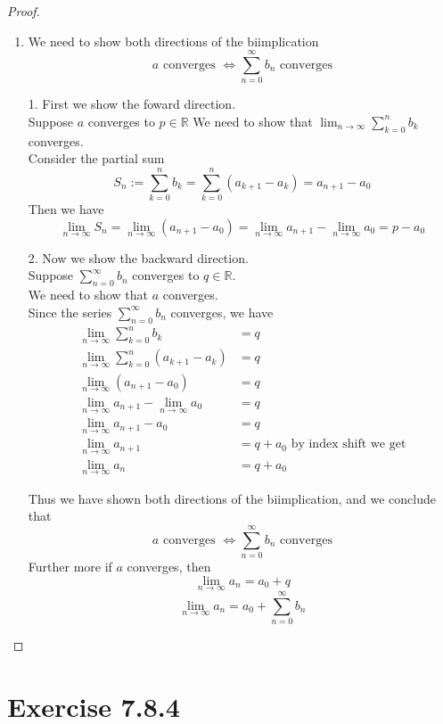 \documentclass{article}
\newcommand{\R}{\mathbb{R}}
\newcommand{\limn}{\lim_{n\to\infty}}
\theoremstyle{mytheoremstyle}
\theoremstyle{mytheoremstyle}
\theoremstyle{myproblemstyle}
\begin{document}
    \begin{proof}
        \begin{enumerate}
            \item We need to show both directions of the biimplication
            $$a \text{ converges } \iff \sum_{n=0}^\infty b_n \text{ converges}$$

            1. First we show the foward direction. \\
            Suppose $a$ converges to $p \in \R$
            We need to show that $\limn \sum_{k=0}^n b_k$ converges. \\
            Consider the partial sum
            $$S_n := \sum_{k=0}^n b_k = \sum_{k=0}^n (a_{k+1}-a_k) = a_{n+1}-a_0$$
            Then we have
            $$\limn S_n = \limn (a_{n+1}-a_0) = \limn a_{n+1} - \limn a_0 = p - a_0$$

            2. Now we show the backward direction. \\
            Suppose $\sum_{n=0}^\infty b_n$ converges to $q \in \R$. \\
            We need to show that $a$ converges. \\
            Since the series $\sum_{n=0}^\infty b_n$ converges, we have
            \begin{align*}
                \limn \sum_{k=0}^n b_k &= q \\
                \limn \sum_{k=0}^n (a_{k+1}-a_k) &= q \\
                \limn (a_{n+1}-a_0) &= q \\
                \limn a_{n+1} - \limn a_0 &= q \\
                \limn a_{n+1} - a_0 &= q \\
                \limn a_{n+1} &= q + a_0 \text{ by index shift we get} \\
                \limn a_n &= q + a_0
            \end{align*}

            Thus we have shown both directions of the biimplication, and we conclude that
            $$a \text{ converges } \iff \sum_{n=0}^\infty b_n \text{ converges}$$
            Further more if $a$ converges, then
            $$\limn a_n = a_0 + q$$
            $$\limn a_n = a_0 + \sum_{n=0}^\infty b_n$$
        \end{enumerate}
    \end{proof}

    \section{Exercise 7.8.4}
\end{document}
